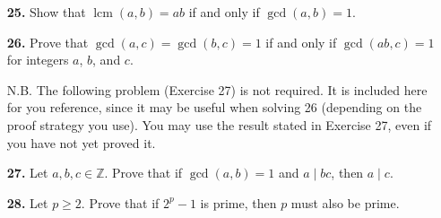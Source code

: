 \documentclass[12pt,reqno]{amsart}
\newcommand{\lcm}{\operatorname{lcm}}
\begin{document}
\begin{enumerate}
\bigskip

\item[{\bf 25.}]
Show that $\lcm(a,b) = ab$ if and only if $\gcd(a,b) = 1$.


\bigskip

\item[{\bf 26.}]
Prove that $\gcd(a,c) = \gcd(b,c) =1$ if and only if $\gcd(ab,c) = 1$ for integers $a$, $b$, and $c$.

N.B. The following problem (Exercise 27) is not required. It is included here for you reference, since it may be useful when solving 26 (depending on the proof strategy you use). You may use the result stated in Exercise 27, even if you have not yet proved it.


\bigskip

\item[{\bf 27.}]
Let $a, b, c \in {\mathbb Z}$.  Prove that if $\gcd(a,b) = 1$ and $a  \mid bc$, then $a  \mid  c$. 

 

\bigskip

\item[{\bf 28.}]
Let $p \geq 2$.  Prove that if $2^p-1$ is prime, then $p$ must also be prime.

\end{enumerate}
\end{document}
